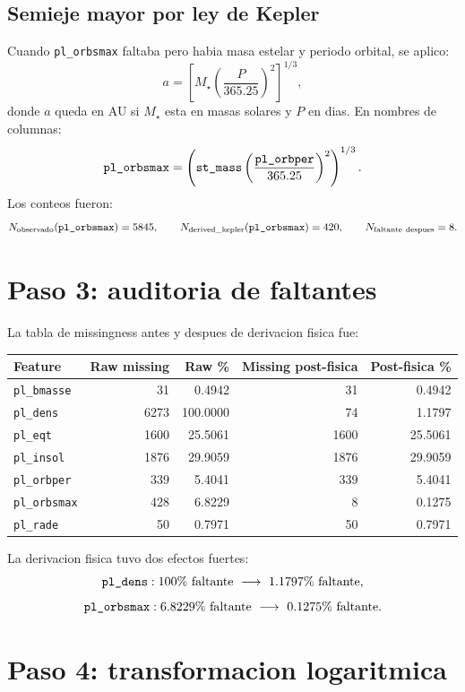 \documentclass[11pt,letterpaper]{article}
\newcommand{\code}[1]{\ifmmode\text{\texttt{#1}}\else\texttt{#1}\fi}
\begin{document}
\subsection{Semieje mayor por ley de Kepler}

Cuando \code{pl\_orbsmax} faltaba pero habia masa estelar y periodo orbital,
se aplico:
\[
  a
  =
  \left[
    M_\star
    \left(\frac{P}{365.25}\right)^2
  \right]^{1/3},
\]
donde \(a\) queda en AU si \(M_\star\) esta en masas solares y \(P\) en dias.
En nombres de columnas:
\[
  \code{pl\_orbsmax}
  =
  \left(
    \code{st\_mass}
    \left(\frac{\code{pl\_orbper}}{365.25}\right)^2
  \right)^{1/3}.
\]
Los conteos fueron:
\[
  N_{\mathrm{observado}}(\code{pl\_orbsmax})=5845,\qquad
  N_{\mathrm{derived\_kepler}}(\code{pl\_orbsmax})=420,\qquad
  N_{\mathrm{faltante\ despues}}=8.
\]

\section{Paso 3: auditoria de faltantes}

La tabla de missingness antes y despues de derivacion fisica fue:
\begin{center}
\begin{tabular}{lrrrr}
\toprule
Feature & Raw missing & Raw \% & Missing post-fisica & Post-fisica \%\\
\midrule
\code{pl\_bmasse}  & 31   & 0.4942  & 31   & 0.4942\\
\code{pl\_dens}    & 6273 & 100.0000& 74   & 1.1797\\
\code{pl\_eqt}     & 1600 & 25.5061 & 1600 & 25.5061\\
\code{pl\_insol}   & 1876 & 29.9059 & 1876 & 29.9059\\
\code{pl\_orbper}  & 339  & 5.4041  & 339  & 5.4041\\
\code{pl\_orbsmax} & 428  & 6.8229  & 8    & 0.1275\\
\code{pl\_rade}    & 50   & 0.7971  & 50   & 0.7971\\
\bottomrule
\end{tabular}
\end{center}

La derivacion fisica tuvo dos efectos fuertes:
\[
  \code{pl\_dens}: 100\%\ \text{faltante}\ \longrightarrow\ 1.1797\%\ \text{faltante},
\]
\[
  \code{pl\_orbsmax}: 6.8229\%\ \text{faltante}\ \longrightarrow\ 0.1275\%\ \text{faltante}.
\]

\section{Paso 4: transformacion logaritmica}
\end{document}
